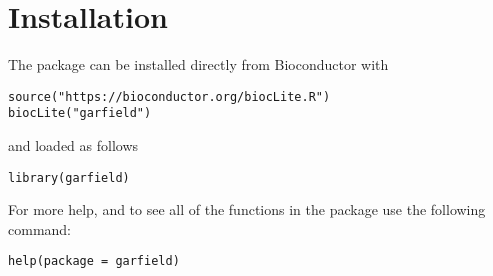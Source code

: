 \documentclass[a4paper]{article}\usepackage[]{graphicx}\usepackage[]{color}
\begin{document}
\section{Installation}
The package can be installed directly from Bioconductor with
\begin{verbatim}
source("https://bioconductor.org/biocLite.R")
biocLite("garfield")
\end{verbatim}
and loaded as follows
\begin{verbatim}
library(garfield)
\end{verbatim}
For more help, and to see all of the functions in the package use the 
following command:
\begin{verbatim}
help(package = garfield)
\end{verbatim}
\end{document}
